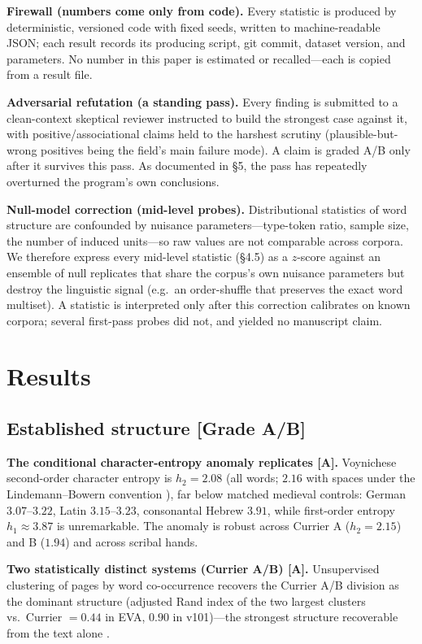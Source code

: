 \documentclass[11pt]{article}
\newcommand{\grade}[1]{{\small\textbf{[#1]}}}
\begin{document}
\textbf{Firewall (numbers come only from code).} Every statistic is produced by
deterministic, versioned code with fixed seeds, written to machine-readable JSON;
each result records its producing script, git commit, dataset version, and
parameters. No number in this paper is estimated or recalled---each is copied from a
result file.

\textbf{Adversarial refutation (a standing pass).} Every finding is submitted to a
clean-context skeptical reviewer instructed to build the strongest case against it,
with positive/associational claims held to the harshest scrutiny (plausible-but-wrong
positives being the field's main failure mode). A claim is graded A/B only after it
survives this pass. As documented in \S5, the pass has repeatedly overturned the
program's own conclusions.

\textbf{Null-model correction (mid-level probes).} Distributional statistics of word
structure are confounded by nuisance parameters---type-token ratio, sample size, the
number of induced units---so raw values are not comparable across corpora. We therefore
express every mid-level statistic (\S4.5) as a $z$-score against an ensemble of null
replicates that share the corpus's own nuisance parameters but destroy the linguistic
signal (e.g.\ an order-shuffle that preserves the exact word multiset). A statistic is
interpreted only after this correction calibrates on known corpora; several first-pass
probes did not, and yielded no manuscript claim.

\section{Results}

\subsection{Established structure \grade{Grade A/B}}
\textbf{The conditional character-entropy anomaly replicates \grade{A}.} Voynichese
second-order character entropy is $h_2 = 2.08$ (all words; $2.16$ with spaces under
the Lindemann--Bowern convention \citep{lindemann2022entropy}), far below matched
medieval controls: German $3.07$--$3.22$, Latin $3.15$--$3.23$, consonantal Hebrew
$3.91$, while first-order entropy $h_1\approx 3.87$ is unremarkable. The anomaly is
robust across Currier A ($h_2=2.15$) and B ($1.94$) and across scribal hands.

\textbf{Two statistically distinct systems (Currier A/B) \grade{A}.} Unsupervised
clustering of pages by word co-occurrence recovers the Currier A/B division as the
dominant structure (adjusted Rand index of the two largest clusters vs.\ Currier
$=0.44$ in EVA, $0.90$ in v101)---the strongest structure recoverable from the text
alone \citep{montemurro2013keywords}.
\end{document}
